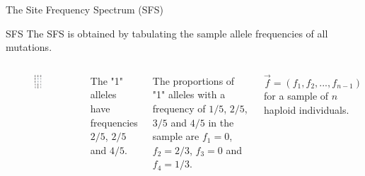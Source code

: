 \begin{frame}{The Site Frequency Spectrum (SFS)}

	\begin{block}{SFS}
	The SFS is obtained by tabulating the sample allele frequencies of all mutations.
	\end{block}

	\begin{columns}


                \begin{figure}
                        \includegraphics[width=0.6\textwidth]{Pics/sequences01_only}
                \end{figure}


		\pause

		The "1" alleles have frequencies $2/5$, $2/5$ and $4/5$.

		The proportions of "1" alleles with a frequency of $1/5$, $2/5$, $3/5$ and $4/5$
		in the sample are \pause $f_1=0$, $f_2=2/3$, $f_3=0$ and $f_4=1/3$.

                \begin{equation*}
                        \vec{f} = (f_1, f_2, ..., f_{n-1})
                \end{equation*}
		for a sample of $n$ haploid individuals.

        \end{columns}

\end{frame}


